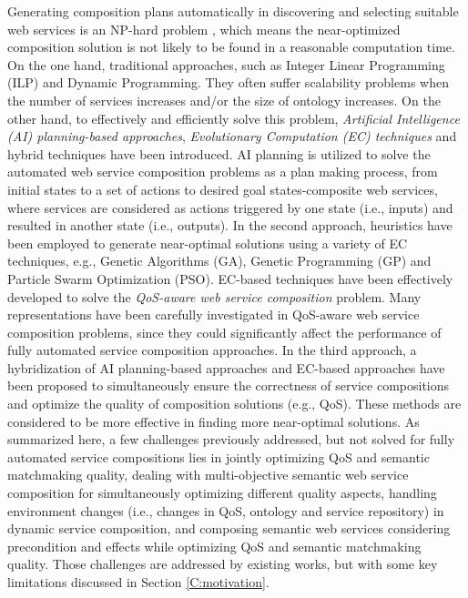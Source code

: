 Generating composition plans automatically in discovering and selecting suitable web services is an NP-hard problem \cite{moghaddam2014service}, which means the near-optimized composition solution is not likely to be found in a reasonable computation time. On the one hand, traditional approaches, such as Integer Linear Programming (ILP) and Dynamic Programming. They often suffer scalability problems when the number of services increases and/or the size of ontology increases. On the other hand, to effectively and efficiently solve this problem, \emph{Artificial Intelligence (AI) planning-based approaches}, \emph{Evolutionary Computation (EC) techniques} and hybrid techniques have been introduced. AI planning is utilized to solve the automated web service composition problems as a plan making process, from initial states to a set of actions to desired goal states-composite web services, where services are considered as actions triggered by one state (i.e., inputs) and resulted in another state (i.e., outputs). In the second approach, heuristics have been employed to generate near-optimal solutions using a variety of EC techniques, e.g., Genetic Algorithms (GA), Genetic Programming (GP) and Particle Swarm Optimization (PSO). EC-based techniques have been effectively developed to solve the \emph{QoS-aware web service composition} problem. Many representations have been carefully investigated in QoS-aware web service composition problems, since they could significantly affect the performance of fully automated service composition approaches. In the third approach, a hybridization of AI planning-based approaches and EC-based approaches \cite{da2016genetic,ma2015hybrid} have been proposed to simultaneously ensure the correctness of service compositions and optimize the quality of composition solutions (e.g., QoS). These methods are considered to be more effective in finding more near-optimal solutions. As summarized here, a few challenges previously addressed, but not solved for fully automated service compositions lies in jointly optimizing QoS and semantic matchmaking quality, dealing with multi-objective semantic web service composition for simultaneously optimizing different quality aspects, handling environment changes (i.e., changes in QoS, ontology and service repository) in dynamic service composition, and composing semantic web services considering precondition and effects while optimizing QoS and semantic matchmaking quality. Those challenges are addressed by existing works, but with some key limitations discussed in Section \ref{C:motivation}. 

